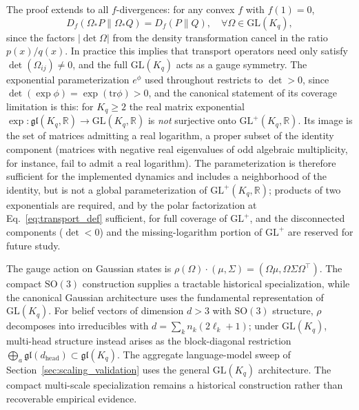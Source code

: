 \documentclass[11pt]{article}
\begin{document}
The proof extends to all $f$-divergences: for any convex $f$ with $f(1) = 0$,
\begin{equation}
D_f(\Omega_* P \| \Omega_* Q) = D_f(P \| Q), \quad \forall \Omega \in \mathrm{GL}(K_q),
\end{equation}
since the factors $|\det\Omega|$ from the density transformation cancel in the ratio $p(x)/q(x)$. In practice this implies that transport operators need only satisfy $\det(\Omega_{ij}) \neq 0$, and the full $\mathrm{GL}(K_q)$ acts as a gauge symmetry. The exponential parameterization $e^{\phi}$ used throughout restricts to $\det > 0$, since $\det(\exp\phi) = \exp(\mathrm{tr}\phi) > 0$, and the canonical statement of its coverage limitation is this: for $K_q \ge 2$ the real matrix exponential $\exp: \mathfrak{gl}(K_q, \mathbb{R}) \to \mathrm{GL}(K_q, \mathbb{R})$ is \emph{not} surjective onto $\mathrm{GL}^+(K_q, \mathbb{R})$. Its image is the set of matrices admitting a real logarithm, a proper subset of the identity component (matrices with negative real eigenvalues of odd algebraic multiplicity, for instance, fail to admit a real logarithm). The parameterization is therefore sufficient for the implemented dynamics and includes a neighborhood of the identity, but is not a global parameterization of $\mathrm{GL}^+(K_q, \mathbb{R})$; products of two exponentials are required, and by the polar factorization at Eq.~\eqref{eq:transport_def} sufficient, for full coverage of $\mathrm{GL}^+$, and the disconnected components ($\det < 0$) and the missing-logarithm portion of $\mathrm{GL}^+$ are reserved for future study.

The gauge action on Gaussian states is $\rho(\Omega)\cdot(\mu,\Sigma)=(\Omega\mu,\Omega\Sigma\Omega^\top)$. The compact $\mathrm{SO}(3)$ construction supplies a tractable historical specialization, while the canonical Gaussian architecture uses the fundamental representation of $\mathrm{GL}(K_q)$. For belief vectors of dimension $d>3$ with $\mathrm{SO}(3)$ structure, $\rho$ decomposes into irreducibles with $d=\sum_k n_k(2\ell_k+1)$; under $\mathrm{GL}(K_q)$, multi-head structure instead arises as the block-diagonal restriction $\bigoplus_a\mathfrak{gl}(d_{\mathrm{head}})\subset\mathfrak{gl}(K_q)$. The aggregate language-model sweep of Section~\ref{sec:scaling_validation} uses the general $\mathrm{GL}(K_q)$ architecture. The compact multi-scale specialization remains a historical construction rather than recoverable empirical evidence.
\end{document}
